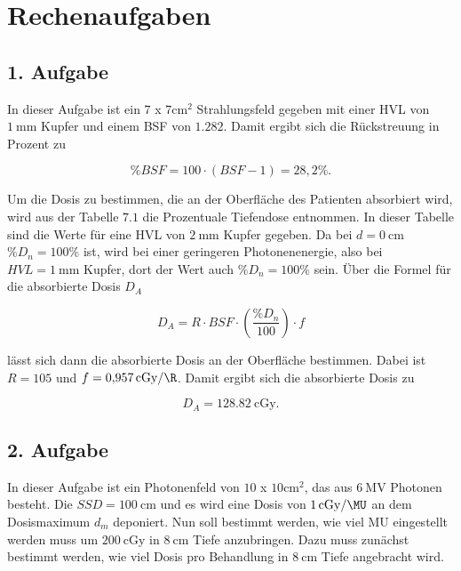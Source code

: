 \section{Rechenaufgaben}

\subsection*{1. Aufgabe}
In dieser Aufgabe ist ein $7$ x $7\si{\centi\meter\squared}$ Strahlungsfeld
gegeben mit einer HVL von $\SI{1}{\milli\meter}$ Kupfer und einem BSF von
$\num{1.282}$.
Damit ergibt sich die Rückstreuung in Prozent zu

\begin{equation*}
  \%BSF = 100 \cdot (BSF - 1) = 28,2 \%.
\end{equation*}

Um die Dosis zu bestimmen, die an der Oberfläche des Patienten absorbiert
wird, wird aus der Tabelle $7.1$ die Prozentuale Tiefendose entnommen.
In dieser Tabelle sind die Werte für eine HVL von $\SI{2}{\milli\meter}$
Kupfer gegeben.
Da bei $d=\SI{0}{\centi\meter}$ $\%D_n = 100\%$ ist, wird bei einer
geringeren Photonenenergie, also bei $HVL = \SI{1}{\milli\meter}$ Kupfer,
dort der Wert auch $\%D_n = 100\%$ sein. Über die Formel für
die absorbierte Dosis $D_A$

\begin{equation*}
  D_A = R \cdot BSF \cdot \left(\frac{\%D_n}{100}\right) \cdot f
\end{equation*}

lässt sich dann die absorbierte Dosis an der Oberfläche bestimmen. Dabei
ist $R=105$ und $f = \SI{0.957}{\centi\gray\per\R}$. Damit ergibt sich die
absorbierte Dosis zu

\begin{equation*}
  D_A = \SI{128.82}{\centi\gray}.
\end{equation*}

\subsection*{2. Aufgabe}

In dieser Aufgabe ist ein Photonenfeld von $10$ x $10
\si{\centi\meter\squared}$, das aus $\SI{6}{\mega\volt}$ Photonen besteht.
Die $SSD = \SI{100}{\centi\meter}$ und es wird eine Dosis von
$\SI{1}{\centi\gray\per\MU}$ an dem Dosismaximum $d_m$ deponiert. Nun
soll bestimmt werden, wie viel MU eingestellt werden muss um
$\SI{200}{\centi\gray}$ in $\SI{8}{\centi\meter}$ Tiefe anzubringen.
Dazu muss zunächst bestimmt werden, wie viel Dosis pro Behandlung in
$\SI{8}{\centi\meter}$ Tiefe angebracht wird.

